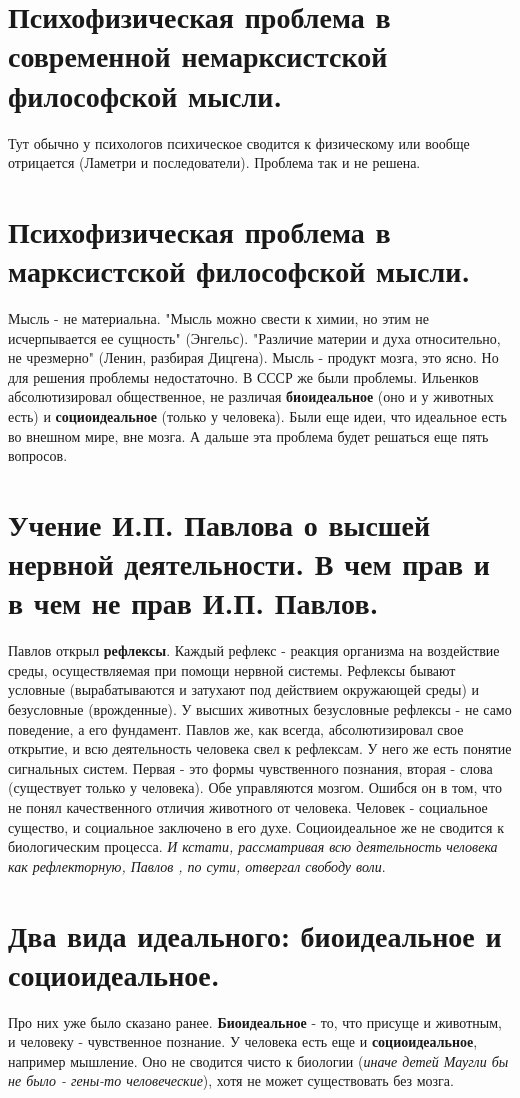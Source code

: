 \section{ Психофизическая проблема в современной немарксистской философской мысли.}
Тут обычно у психологов психическое сводится к физическому или вообще отрицается (Ламетри и последователи). Проблема так и не решена. 

\section{ Психофизическая проблема в марксистской философской мысли.}
Мысль - не материальна. "Мысль можно свести к химии, но этим не исчерпывается ее сущность" (Энгельс). "Различие материи и духа относительно, не чрезмерно" (Ленин, разбирая Дицгена). Мысль - продукт мозга, это ясно. Но для решения проблемы недостаточно. В СССР же были проблемы. Ильенков абсолютизировал общественное, не различая \textbf{биоидеальное} (оно и у животных есть) и \textbf{социоидеальное} (только у человека). Были еще идеи, что идеальное есть во внешном мире, вне мозга.
А дальше эта проблема будет решаться еще пять вопросов.

\section{ Учение И.П. Павлова о высшей нервной деятельности. В чем прав и в чем не прав И.П. Павлов.}
Павлов открыл \textbf{рефлексы}. Каждый рефлекс - реакция организма на воздействие среды, осуществляемая при помощи нервной системы. Рефлексы бывают условные (вырабатываются и затухают под действием окружающей среды) и безусловные (врожденные). У высших животных безусловные рефлексы - не само поведение, а его фундамент. Павлов же, как всегда, абсолютизировал свое открытие, и всю деятельность человека свел к рефлексам. У него же есть понятие сигнальных систем. Первая - это формы чувственного познания, вторая - слова (существует только у человека). Обе управляются мозгом. Ошибся он в том, что не понял качественного отличия животного от человека. Человек - социальное существо, и социальное заключено в его духе. Социоидеальное же не сводится к биологическим процесса. \textit{И кстати, рассматривая всю деятельность человека как рефлекторную, Павлов , по сути, отвергал свободу воли}. 

\section{ Два вида идеального: биоидеальное и социоидеальное.}
Про них уже было сказано ранее. \textbf{Биоидеальное} - то, что присуще и животным, и человеку - чувственное познание. У человека есть еще и \textbf{социоидеальное}, например мышление. Оно не сводится чисто к биологии (\textit{иначе детей Маугли бы не было - гены-то человеческие}), хотя не может существовать без мозга.

